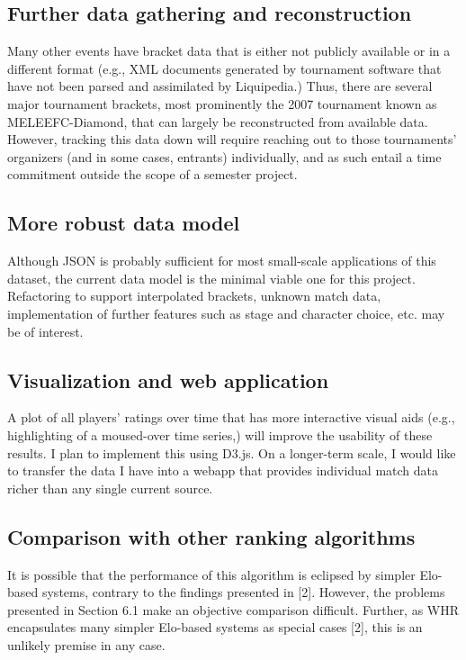 \documentclass[10pt]{article}
\theoremstyle{definition}
\theoremstyle{remark}
\begin{document}
\subsection{Further data gathering and reconstruction}
Many other events have bracket data that is either not publicly available or
in a different format (e.g., XML documents generated by tournament software
that have not been parsed and assimilated by Liquipedia.) Thus, there are
several major tournament brackets, most prominently the 2007 tournament known
as MELEEFC-Diamond, that can largely be reconstructed from available data.
However, tracking this data down will require reaching out to those
tournaments' organizers (and in some cases, entrants) individually, and as
such entail a time commitment outside the scope of a semester project.

\subsection{More robust data model}
Although JSON is probably sufficient for most small-scale applications of this
dataset, the current data model is the minimal viable one for this project.
Refactoring to support interpolated brackets, unknown match data, implementation
of further features such as stage and character choice, etc. may be of interest.

\subsection{Visualization and web application}
A plot of all players' ratings over time that has more interactive visual aids (e.g.,
highlighting of a moused-over time series,) will improve the usability of these
results. I plan to implement this using D3.js. On a longer-term scale, I would like
to transfer the data I have into a webapp that provides individual match data
richer than any single current source.

\subsection{Comparison with other ranking algorithms}
It is possible that the performance of this algorithm is eclipsed by simpler Elo-based
systems, contrary to the findings presented in [2]. However, the problems presented
in Section 6.1 make an objective comparison difficult. Further, as WHR encapsulates
many simpler Elo-based systems as special cases [2], this is an unlikely premise
in any case.
\end{document}
